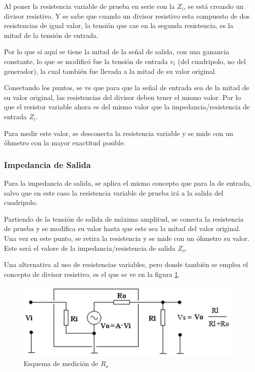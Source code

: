Al poner la resistencia variable de prueba en serie con la $Z_i$, se está creando un divisor resistivo. Y se sabe que cuando un divisor resistivo esta compuesto de dos resistencias de igual valor, la tensión que cae en la segunda resistencia, es la mitad de la tensión de entrada. 

Por lo que si aquí se tiene la mitad de la señal de salida, con una ganancia constante, lo que se modificó fue la tensión de entrada $v_i$ (del cuadripolo, no del generador), la cual también fue llevada a la mitad de su valor original.

Conectando los puntos, se ve que para que la señal de entrada sea de la mitad de su valor original, las resistencias del divisor deben tener el mismo valor. Por lo que el resistor variable ahora es del mismo valor que la impedancia/resistencia de entrada $Z_i$.

Para medir este valor, se desconecta la resistencia variable y se mide con un óhmetro con la mayor exactitud posible.

\subsubsection{Impedancia de Salida}
\label{sec:Zo}

Para la impedancia de salida, se aplica el mismo concepto que para la de entrada, salvo que en este caso la resistencia variable de prueba irá a la salida del cuadripolo. 

Partiendo de la tensión de salida de máxima amplitud, se conecta la resistencia de prueba y se modifica su valor hasta que este sea la mitad del valor original. Una vez en este punto, se retira la resistencia y se mide con un óhmetro su valor. Este será el valore de la impedancia/resistencia de salida $Z_o$.

Una alternativa al uso de resistencias variables, pero donde también se emplea el concepto de divisor resistivo, es el que se ve en la figura \ref{fig:medRo}.

\begin{figure}[h]
    \centering
    \includegraphics[width=0.6\linewidth]{Imagenes/medRo.png}
    \caption{Esquema de medición de $R_o$}
    \label{fig:medRo}
\end{figure}


